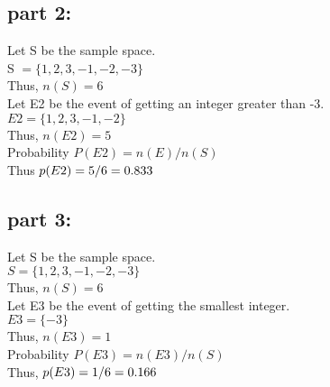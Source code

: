\documentclass[twocolumn]{article}
\begin{document}
\subsection{part 2:}
Let S be the sample space.\\
S $=\{1,2,3,-1,-2,-3\}$\\
Thus, $ n (S) = 6$\\
Let E2 be the event of getting an integer greater than -3.\\
$E2 = \{1,2,3,-1,-2\}$\\
Thus, $ n (E2) = 5$\\
Probability $  P(E2) = n(E)/n(S)$\\
Thus  $ p(E2) =5/6\\
             =0.833$\\
\subsection{part 3:}
Let S be the sample space.\\
$S =\{1,2,3,-1,-2,-3\}$\\
Thus, $  n(S) = 6$\\
Let E3 be the event of getting the smallest integer.\\
$ E3 = \{-3\}$\\
Thus, $ n(E3) = 1$\\
Probability  $ P(E3) = n(E3)/n(S)$\\
Thus, $ p(E3) = 1/6\\
=0.166$\\
\end{document}

